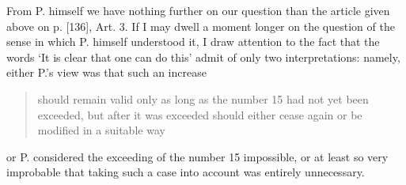 From P. himself we have nothing further on our question than the article given above on p. [136], Art. 3. If I may dwell a moment longer on the question of the sense in which P. himself understood it, I draw attention to the fact that the words ‘It is clear that one can do this’ admit of only two interpretations: namely, either P.'s view was that such an increase
\begin{quote}
should remain valid only as long as the number 15 had not yet been exceeded, but after it was exceeded should either cease again or be modified in a suitable way
\end{quote}
\noindent or P. considered the exceeding of the number 15 impossible, or at least so very improbable that taking such a case into account was entirely unnecessary.
